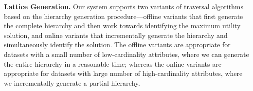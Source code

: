 \textbf{Lattice Generation.} Our system supports two variants of traversal algorithms based on the hierarchy generation procedure---offline variants that first generate the complete hierarchy and then work towards identifying the maximum utility solution, and online variants that incrementally generate the hierarchy and simultaneously identify the solution. The offline variants are appropriate for datasets with a small number of low-cardinality attributes, where we can generate the entire hierarchy in a reasonable time; whereas the online variants are appropriate for datasets with large number of high-cardinality attributes, where we incrementally generate a partial hierarchy. 


